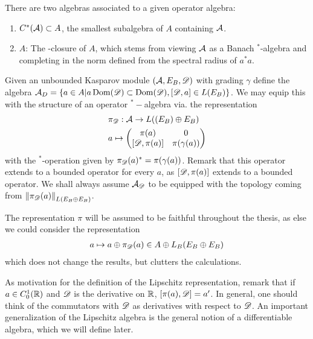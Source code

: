 \begin{remark}
	There are two \Cstar algebras associated to a given operator algebra:
	\begin{enumerate}
	\item
	$C^*(\mathcal{A})\subset A$, the smallest subalgebra of $A$ containing $\mathcal{A}$. 
	\item
	$A$: The \Cstar-closure of $A$, which stems from viewing $\mathcal{A}$ as a Banach $^*$-algebra and completing in the norm defined from the spectral radius of $a^*a$. 
	\end{enumerate}
\end{remark}
\begin{definition}
Given an unbounded Kasparov module $(\mathcal{A},E_B,\mathscr{D})$ with grading $\gamma$ define the algebra $\mathcal{A}_D=\{a\in A| a\operatorname{Dom}(\mathscr{D}) \subset \operatorname{Dom}(\mathscr{D}), [\mathscr{D},a]\in L(E_B)\}$. We may equip this with the structure of an operator $^*-$algebra via. the representation 
\begin{align*}
	&\pi_{\D}:\A\to L((E_B)\osum E_B) \\
	&a\mapsto \begin{pmatrix} \pi(a) & 0 \\ [\D,\pi(a)] & \pi(\gamma(a)) \end{pmatrix}
\end{align*} 
with the $^*$-operation given by $\pi_{\mathscr{D}}(a)^*=\pi(\gamma(a))$. Remark that this operator extends to a bounded operator for every $a$, as $[\mathscr{D},\pi(a)]$ extends to a bounded operator. We shall always assume $\mathcal{A}_{\mathscr{D}}$ to be equipped with the topology coming from $\left \Vert \pi_{\mathscr{D}}(a) \right \Vert_{L(E_B\oplus E_B)}$. 
\end{definition}
\begin{assumption}
	The representation $\pi$ will be assumed to be faithful throughout the thesis, as else we could consider the representation 
	\begin{align*}
		a\mapsto a\oplus \pi_{\mathscr{D}}(a) \in A\oplus L_B(E_B\oplus E_B)
	\end{align*}
	which does not change the results, but clutters the calculations. 
\end{assumption}
As motivation for the definition of the Lipschitz representation, remark that if $a\in C_0^1(\mathbb{R})$ and $\mathscr{D}$ is the derivative on $\mathbb{R}$, $[\pi(a),\mathscr{D}]=a'$. In general, one should think of the commutators with $\mathscr{D}$ as derivatives with respect to $\mathscr{D}$. An important generalization of the Lipschitz algebra is the general notion of a differentiable algebra, which we will define later. 
